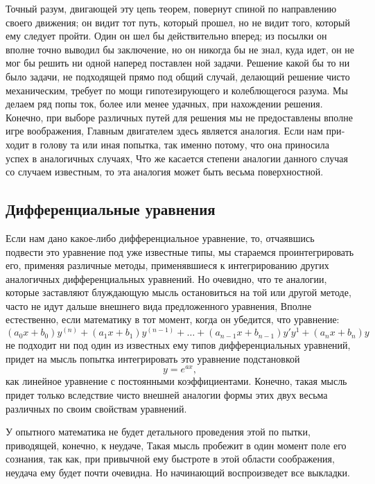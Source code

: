 Точный разум, двигающей эту цепь теорем, повернут спиной по направлению своего
движения; он видит тот путь, который прошел, но не видит того, который ему
следует пройти. Один он шел бы действительно вперед; из посылки он вполне точно
выводил бы заключение, но он никогда бы не знал, куда идет, он не мог бы решить
ни одной наперед поставлен­ ной задачи. Решение какой бы то ни было задачи, не
подходящей прямо под общий случай, делающий решение чисто механическим, требует
по­ мощи гипотезирующего и колеблющегося разума. Мы делаем ряд попы­ ток, более
или менее удачных, при нахождении решения. Конечно, при выборе различных
путей для решения мы не предоставлены вполне игре воображения, Главным
двигателем здесь является аналогия. Если нам при­ ходит в голову та или иная
попытка, так именно потому, что она приносила успех в аналогичных случаях, Что
же касается степени аналогии данного случая со случаем известным, то эта
аналогия может быть весьма поверхностной.

\subsection{Дифференциальные уравнения}

Если нам дано какое-либо дифференциальное уравнение, то, отчаявшись подвести
это уравнение под уже известные типы, мы стараемся проинтегрировать его,
применяя различные методы, применявшиеся к интегрированию других аналогичных
дифференциальных уравнений. Но очевидно, что те аналогии, которые заставляют
блуждающую мысль остановиться на той или другой методе, часто не идут дальше
внешнего вида предложенного уравнения, Вполне естественно, если математику в
тот момент, когда он убедится, что уравнение:
\begin{equation}
  \left(a_0x+b_0\right)y^{(n)}
  + \left(a_1x+b_1\right)y^{(n-1)} 
  + \dots
  + \left(a_{n-1}x+b_{n-1}\right)y'y^{1} 
  + \left(a_nx+b_n\right)y
\end{equation}
не подходит ни под один из известных ему типов дифференциальных уравнений,
придет на мысль попытка интегрировать это уравнение подстановкой
$$y=e^{ax},$$
как линейное уравнение с постоянными коэффициентами. Конечно, такая мысль
придет только вследствие чисто внешней аналогии формы этих двух весьма
различных по своим свойствам уравнений.

У опытного математика не будет детального проведения этой по пытки, приводящей,
конечно, к неудаче, Такая мысль пробежит в один момент поле его сознания, так
как, при привычной ему быстроте в этой области соображения, неудача ему будет
почти очевидна. Но начинающий воспроизведет все выкладки.


